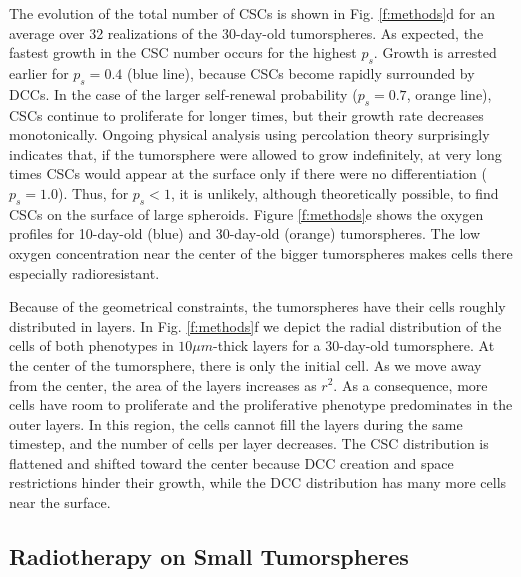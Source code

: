 \documentclass[10pt,letterpaper]{article}
\begin{document}
The evolution of the total number of CSCs is shown in Fig. \ref{f:methods}d for an average over 32 realizations of the 30-day-old tumorspheres. As expected, the fastest growth in the CSC number occurs for the highest $p_s$. Growth is arrested earlier for $p_s = 0.4$ (blue line), because CSCs become rapidly surrounded by DCCs. In the case of the larger self-renewal probability ($p_s = 0.7$, orange line), CSCs continue to proliferate for longer times, but their growth rate decreases monotonically. Ongoing physical analysis using percolation theory surprisingly indicates that, if the tumorsphere were allowed to grow indefinitely, at very long times CSCs would appear at the surface only if there were no differentiation ($p_s=1.0$). Thus, for $p_s<1$, it is unlikely, although theoretically possible, to find CSCs on the surface of large spheroids. Figure \ref{f:methods}e shows the oxygen profiles for 10-day-old (blue) and 30-day-old (orange) tumorspheres. The low oxygen concentration near the center of the bigger tumorspheres makes cells there especially radioresistant.

Because of the geometrical constraints, the tumorspheres have their cells roughly distributed in layers. In Fig. \ref{f:methods}f we depict the radial distribution of the cells of both phenotypes in $10 \mu m$-thick layers for a 30-day-old tumorsphere. At the center of the tumorsphere, there is only the initial cell. As we move away from the center, the area of the layers increases as $r^2$. As a consequence, more cells have room to proliferate and the proliferative phenotype predominates in the outer layers. In this region, the cells cannot fill the layers during the same timestep, and the number of cells per layer decreases.  The CSC distribution is flattened and shifted toward the center because DCC creation and space restrictions hinder their growth, while the DCC distribution has many more cells near the surface.





\subsection*{Radiotherapy on Small Tumorspheres}
\end{document}
